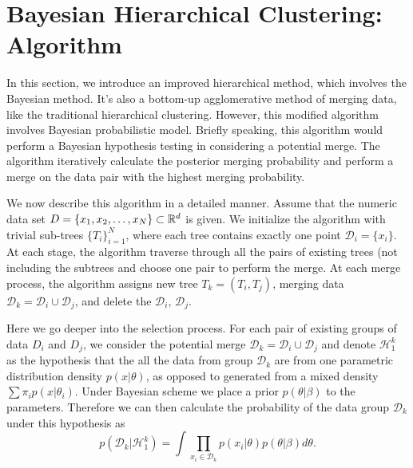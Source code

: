 \section{Bayesian Hierarchical Clustering: Algorithm}

In this section, we introduce an improved hierarchical method, which involves the Bayesian method. It's also a bottom-up agglomerative method of merging data, like the traditional hierarchical clustering. However, this modified algorithm involves Bayesian probabilistic model. Briefly speaking, this algorithm would perform a Bayesian hypothesis testing in considering a potential merge. The algorithm iteratively calculate the posterior merging probability and perform a merge on the data pair with the highest merging probability.

We now describe this algorithm in a detailed manner. Assume that the numeric data set $D=\{ x_1, x_2, \dots, x_N \}\subset \mathbb{R}^d$ is given. We initialize the algorithm with trivial sub-trees $\{T_i\}_{i=1}^N$, where each tree contains exactly one point $\mathcal{D}_i=\{x_i\}$. At each stage, the algorithm traverse through all the pairs of existing trees (not including the subtrees and choose one pair to perform the merge. At each merge process, the algorithm assigns new tree $T_k=(T_i,T_j)$, merging data $\mathcal{D}_k=\mathcal{D}_i \cup \mathcal{D}_j$, and delete the  $\mathcal{D}_i,\,\mathcal{D}_j$.

Here we go deeper into the selection process. For each pair of existing groups of data $D_i$ and $D_j$, we consider the potential merge $\mathcal{D}_k=\mathcal{D}_i\cup \mathcal{D}_j$ and denote $\mathcal{H}_1^k$ as the hypothesis that the all the data from group $\mathcal{D}_k$ are from one parametric distribution density $p(x|\theta)$, as opposed to generated from a mixed density $\sum \pi_i p(x|\theta_i)$. Under Bayesian scheme we place a prior $p(\theta|\beta)$ to the parameters. Therefore we can then calculate the probability of the data group $\mathcal{D}_k$ under this hypothesis as
\begin{equation*}
    p(\mathcal{D}_k|\mathcal{H}_1^k) =\int \prod_{x_i \in \mathcal{D}_k} p(x_i|\theta) p(\theta|\beta) d\theta.
\end{equation*}

